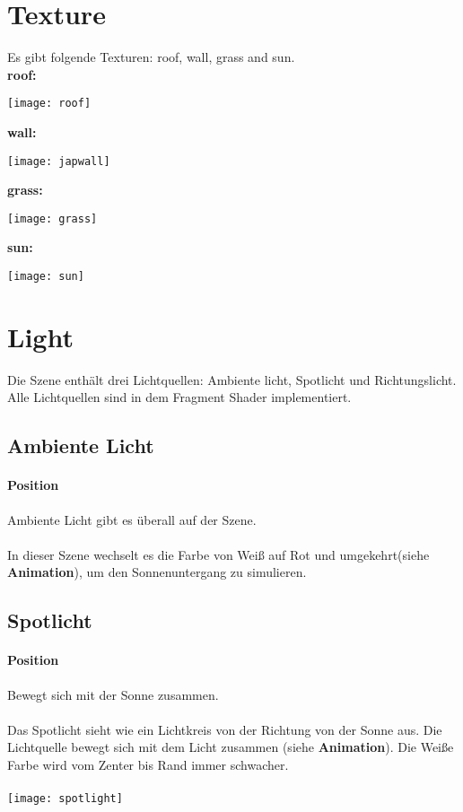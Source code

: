 \documentclass[12pt]{article}
\begin{document}
\pagebreak

\section{Texture}
Es gibt folgende Texturen: roof, wall, grass and sun. \\
\textbf{roof:}
\begin{center}
\texttt{[image: roof]} \\
\end{center}
\textbf{wall:}
\begin{center}
\texttt{[image: japwall]} \\
\end{center}
\textbf{grass:}
\begin{center}
\texttt{[image: grass]} \\
\end{center}
\textbf{sun:}
\begin{center}
\texttt{[image: sun]}
\end{center}

\pagebreak
\section{Light}
Die Szene enthält drei Lichtquellen: Ambiente licht, Spotlicht und Richtungslicht.
Alle Lichtquellen sind in dem Fragment Shader implementiert.
\subsection{Ambiente Licht}
\paragraph{Position} Ambiente Licht gibt es überall auf der Szene. \\\\
In dieser Szene wechselt es die Farbe von Weiß auf Rot und umgekehrt(siehe \textbf{Animation}), um den Sonnenuntergang zu simulieren.
\subsection{Spotlicht}
\paragraph{Position} Bewegt sich mit der Sonne zusammen.\\\\ 
Das Spotlicht sieht wie ein Lichtkreis von der Richtung von der Sonne aus. Die Lichtquelle bewegt sich mit dem Licht zusammen (siehe \textbf{Animation}).
Die Weiße Farbe wird vom Zenter bis Rand immer schwacher. \\\\ 
\texttt{[image: spotlight]}
\pagebreak
\end{document}
